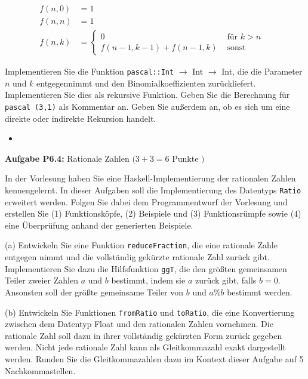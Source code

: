 $$
\begin{array}{rlr}
f(n, 0) & =1 \\
f(n, n) & =1 & \\
f(n, k) & = \begin{cases}0 & \text { für } k>n \\
f(n-1, k-1)+f(n-1, k) & \text { sonst }\end{cases}
\end{array}
$$

Implementieren Sie die Funktion \texttt{pascal::Int} $\rightarrow$ Int $\rightarrow$ Int, die die Parameter $n$ und $k$ entgegennimmt und den Binomialkoeffizienten zurückliefert. Implementieren Sie dies als rekursive Funktion. Geben Sie die Berechnung für \texttt{pascal (3,1)} als Kommentar an. Geben Sie außerdem an, ob es sich um eine direkte oder indirekte Rekursion handelt.

\begin{itemize}
  \item []\inputminted{Haskell}{A6_3.hs}
\end{itemize}

\newpage

\textbf{Aufgabe P6.4:} Rationale Zahlen $(3+3=6$ Punkte $)$ 

In der Vorlesung haben Sie eine Haskell-Implementierung der rationalen Zahlen kennengelernt. 
In dieser Aufgaben soll die Implementierung des Datentyps \texttt{Ratio} erweitert werden. Folgen Sie 
dabei dem Programmentwurf der Vorlesung und erstellen Sie (1) Funktionsköpfe, (2) Beispiele 
und (3) Funktionsrümpfe sowie (4) eine Überprüfung anhand der generierten Beispiele.

(a) Entwickeln Sie eine Funktion \texttt{reduceFraction}, die eine rationale Zahle 
entgegen nimmt und die vollständig gekürzte rationale Zahl zurück gibt. Implementieren Sie dazu 
die Hilfsfunktion \texttt{ggT}, die den größten gemeinsamen Teiler zweier Zahlen $a$ und $b$ bestimmt, 
indem sie $a$ zurück gibt, falls $b=0$. Ansonsten soll der größte gemeinsame Teiler von $b$ und 
$a \% b$ bestimmt werden.

(b) Entwickeln Sie Funktionen \texttt{fromRatio} und \texttt{toRatio}, 
die eine Konvertierung zwischen dem 
Datentyp Float und den rationalen Zahlen vornehmen. Die rationale Zahl soll dazu in ihrer 
vollständig gekürzten Form zurück gegeben werden. Nicht jede rationale Zahl kann als 
Gleitkommazahl exakt dargestellt werden. Runden Sie die Gleitkommazahlen dazu im Kontext 
dieser Aufgabe auf 5 Nachkommastellen.


